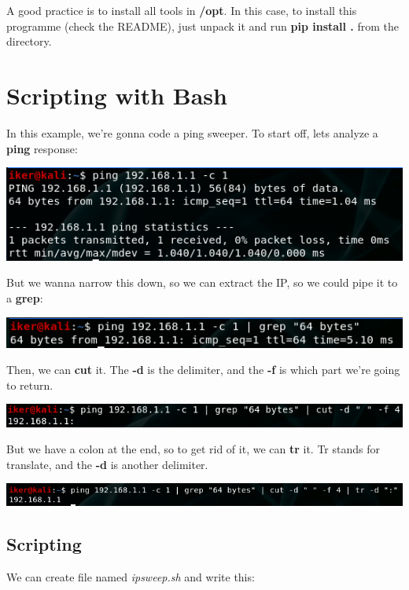 \documentclass[11pt,a4paper]{article}
\begin{document}
A good practice is to install all tools in \textbf{/opt}. In this case, to install this programme (check the README), just unpack it and run \textbf{pip install .} from the directory.

\section{Scripting with Bash}
In this example, we're gonna code a ping sweeper. To start off, lets analyze a \textbf{ping} response:
\begin{center}
\includegraphics[scale=.6]{ping.png}
\end{center}
But we wanna narrow this down, so we can extract the IP, so we could pipe it to a \textbf{grep}:
\begin{center}
\includegraphics[scale=.6]{pinggrep.png}
\end{center}
Then, we can \textbf{cut} it. The \textbf{-d} is the delimiter, and the \textbf{-f} is which part we're going to return.
\begin{center}
\includegraphics[scale=.6]{pinggrepcut.png}
\end{center}
But we have a colon at the end, so to get rid of it, we can \textbf{tr} it. Tr stands for translate, and the \textbf{-d} is another delimiter.
\begin{center}
\includegraphics[scale=.6]{pinggrepcuttr.png}
\end{center}

\subsection{Scripting}
We can create file named \textit{ipsweep.sh} and write this:
\end{document}
